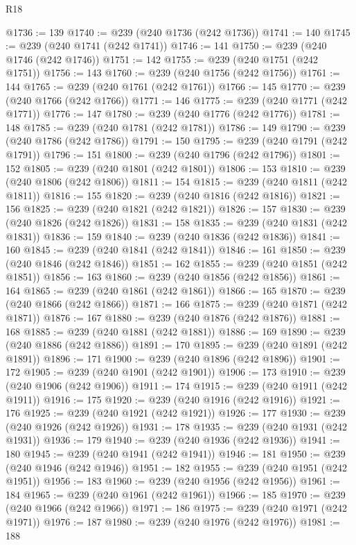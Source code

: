 \begin{lexlean}{R18}
\begin{coremodule}
@1736 := 139
@1740 := @239 (@240 @1736 (@242 @1736))
@1741 := 140
@1745 := @239 (@240 @1741 (@242 @1741))
@1746 := 141
@1750 := @239 (@240 @1746 (@242 @1746))
@1751 := 142
@1755 := @239 (@240 @1751 (@242 @1751))
@1756 := 143
@1760 := @239 (@240 @1756 (@242 @1756))
@1761 := 144
@1765 := @239 (@240 @1761 (@242 @1761))
@1766 := 145
@1770 := @239 (@240 @1766 (@242 @1766))
@1771 := 146
@1775 := @239 (@240 @1771 (@242 @1771))
@1776 := 147
@1780 := @239 (@240 @1776 (@242 @1776))
@1781 := 148
@1785 := @239 (@240 @1781 (@242 @1781))
@1786 := 149
@1790 := @239 (@240 @1786 (@242 @1786))
@1791 := 150
@1795 := @239 (@240 @1791 (@242 @1791))
@1796 := 151
@1800 := @239 (@240 @1796 (@242 @1796))
@1801 := 152
@1805 := @239 (@240 @1801 (@242 @1801))
@1806 := 153
@1810 := @239 (@240 @1806 (@242 @1806))
@1811 := 154
@1815 := @239 (@240 @1811 (@242 @1811))
@1816 := 155
@1820 := @239 (@240 @1816 (@242 @1816))
@1821 := 156
@1825 := @239 (@240 @1821 (@242 @1821))
@1826 := 157
@1830 := @239 (@240 @1826 (@242 @1826))
@1831 := 158
@1835 := @239 (@240 @1831 (@242 @1831))
@1836 := 159
@1840 := @239 (@240 @1836 (@242 @1836))
@1841 := 160
@1845 := @239 (@240 @1841 (@242 @1841))
@1846 := 161
@1850 := @239 (@240 @1846 (@242 @1846))
@1851 := 162
@1855 := @239 (@240 @1851 (@242 @1851))
@1856 := 163
@1860 := @239 (@240 @1856 (@242 @1856))
@1861 := 164
@1865 := @239 (@240 @1861 (@242 @1861))
@1866 := 165
@1870 := @239 (@240 @1866 (@242 @1866))
@1871 := 166
@1875 := @239 (@240 @1871 (@242 @1871))
@1876 := 167
@1880 := @239 (@240 @1876 (@242 @1876))
@1881 := 168
@1885 := @239 (@240 @1881 (@242 @1881))
@1886 := 169
@1890 := @239 (@240 @1886 (@242 @1886))
@1891 := 170
@1895 := @239 (@240 @1891 (@242 @1891))
@1896 := 171
@1900 := @239 (@240 @1896 (@242 @1896))
@1901 := 172
@1905 := @239 (@240 @1901 (@242 @1901))
@1906 := 173
@1910 := @239 (@240 @1906 (@242 @1906))
@1911 := 174
@1915 := @239 (@240 @1911 (@242 @1911))
@1916 := 175
@1920 := @239 (@240 @1916 (@242 @1916))
@1921 := 176
@1925 := @239 (@240 @1921 (@242 @1921))
@1926 := 177
@1930 := @239 (@240 @1926 (@242 @1926))
@1931 := 178
@1935 := @239 (@240 @1931 (@242 @1931))
@1936 := 179
@1940 := @239 (@240 @1936 (@242 @1936))
@1941 := 180
@1945 := @239 (@240 @1941 (@242 @1941))
@1946 := 181
@1950 := @239 (@240 @1946 (@242 @1946))
@1951 := 182
@1955 := @239 (@240 @1951 (@242 @1951))
@1956 := 183
@1960 := @239 (@240 @1956 (@242 @1956))
@1961 := 184
@1965 := @239 (@240 @1961 (@242 @1961))
@1966 := 185
@1970 := @239 (@240 @1966 (@242 @1966))
@1971 := 186
@1975 := @239 (@240 @1971 (@242 @1971))
@1976 := 187
@1980 := @239 (@240 @1976 (@242 @1976))
@1981 := 188

\end{coremodule}
\end{lexlean}
